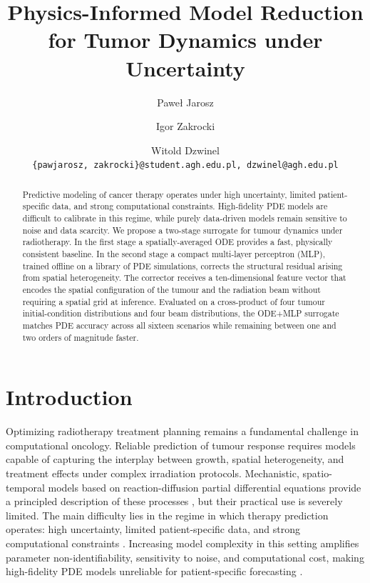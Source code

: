 \documentclass[runningheads]{llncs}
\title{
    \textbf{Physics-Informed Model Reduction for Tumor Dynamics under Uncertainty}
}
\author{
    Paweł Jarosz \and Igor Zakrocki \and Witold Dzwinel \\
    \vspace{0.1cm}
    \texttt{\{pawjarosz, zakrocki\}@student.agh.edu.pl, dzwinel@agh.edu.pl}
}
\institute{
    The Faculty of Computer Science, AGH University in Cracow
}
\begin{document}
\maketitle

\begin{abstract}
Predictive modeling of cancer therapy operates under high uncertainty, limited
patient-specific data, and strong computational constraints.  High-fidelity PDE
models are difficult to calibrate in this regime, while purely data-driven models
remain sensitive to noise and data scarcity.  We propose a two-stage surrogate for
tumour dynamics under radiotherapy.  In the first stage a spatially-averaged ODE
provides a fast, physically consistent baseline.  In the second stage a compact
multi-layer perceptron (MLP), trained offline on a library of PDE simulations,
corrects the structural residual arising from spatial heterogeneity.  The corrector
receives a ten-dimensional feature vector that encodes the spatial configuration of
the tumour and the radiation beam without requiring a spatial grid at inference.
Evaluated on a cross-product of four tumour initial-condition distributions and four
beam distributions, the ODE+MLP surrogate matches PDE accuracy across all sixteen
scenarios while remaining between one and two orders of magnitude faster.
\end{abstract}

\section{Introduction}

Optimizing radiotherapy treatment planning remains a fundamental challenge in
computational oncology.  Reliable prediction of tumour response requires models
capable of capturing the interplay between growth, spatial heterogeneity, and
treatment effects under complex irradiation protocols.  Mechanistic,
spatio-temporal models based on reaction-diffusion partial differential equations
provide a principled description of these processes
\cite{murray2002mathematical,swanson2000quantitative,tracqui2009biophysical}, but
their practical use is severely limited.  The main difficulty lies in the regime in
which therapy prediction operates: high uncertainty, limited patient-specific data,
and strong computational constraints \cite{yankeelov2013clinically,hormuth2021mechanically}.
Increasing model complexity in this setting amplifies parameter non-identifiability,
sensitivity to noise, and computational cost, making high-fidelity PDE models
unreliable for patient-specific forecasting \cite{altrock2015mathematics,oden2016toward}.
\end{document}
